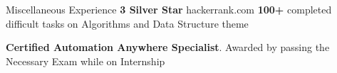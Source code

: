 \begin{rubric}{Miscellaneous Experience}
\entry*[2022] \textbf{3 Silver Star} hackerrank.com
\entry*[2023] \textbf{100+} completed difficult tasks on Algorithms and Data Structure theme

\entry*[2021] \textbf{Certified Automation Anywhere Specialist}. Awarded by passing the Necessary Exam while on Internship
\end{rubric}